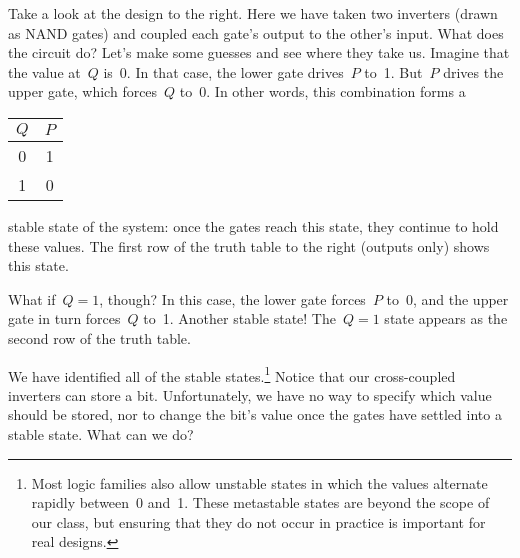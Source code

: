\begin{minipage}{3.55in}
Take a look at the design to the right.  Here we have taken two 
inverters (drawn as NAND gates) and coupled each gate's output to
the other's input.  What does the circuit do?  Let's make some
guesses and see where they take us.  Imagine that the value at~$Q$
is~0.  In that case, the lower gate drives~$P$ to~1.  
But~$P$ drives the upper gate, which forces~$Q$ to~0.
In other words, this combination forms a\linebreak
\end{minipage}\hspace{.25in}%
\begin{minipage}{1.65in}
\vspace{12pt}
\end{minipage}\hspace{.5in}%
\begin{minipage}{0.55in}
\begin{tabular}{|cc}
$Q$& $P$\\ \hline
0& 1\\
1& 0
\end{tabular}\vspace{12pt}
\end{minipage}\mpdone

stable state of the system:
once the gates reach this state, they continue to hold these values.
The first row of the truth table to the right (outputs only) shows
this state.

What if~$Q=1$, though?  In this case, the lower gate forces~$P$ to~0,
and the upper gate in turn forces~$Q$ to~1.  Another stable state!
The~$Q=1$ state appears as the second row of the truth table.

We have identified all of the stable states.\footnote{Most logic
families also allow unstable states in which the values alternate rapidly 
between~0 and~1.  These metastable states are 
beyond the scope of our class, but ensuring that they do not occur
in practice is important for real designs.}  Notice that our cross-coupled
inverters can store a bit.  Unfortunately, we have no way to 
specify which value should be stored, nor to change the bit's value
once the gates have settled into a stable state.
What can we do?  

\vfill
\vfill
\pagebreak

